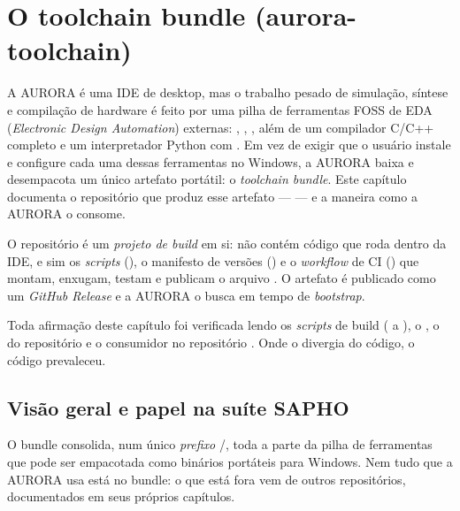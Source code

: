 \chapter{O toolchain bundle (aurora-toolchain)}
\label{cap:14-toolchain-bundle}

A AURORA é uma IDE de desktop, mas o trabalho pesado de simulação, síntese e
compilação de hardware é feito por uma pilha de ferramentas FOSS de EDA
(\emph{Electronic Design Automation}) externas: , ,
, além de um compilador C/C++ completo e um interpretador Python com
. Em vez de exigir que o usuário instale e configure cada uma dessas
ferramentas no Windows, a AURORA baixa e desempacota um único artefato portátil:
o \emph{toolchain bundle}. Este capítulo documenta o repositório que produz esse
artefato ---  --- e a maneira como a AURORA o consome.

O repositório  é um \emph{projeto de build} em si: não
contém código que roda dentro da IDE, e sim os \emph{scripts} (),
o manifesto de versões () e o \emph{workflow} de CI
() que montam, enxugam, testam e publicam o
arquivo . O artefato é publicado como um \emph{GitHub
Release} e a AURORA o busca em tempo de \emph{bootstrap}.

\begin{nota}
Toda afirmação deste capítulo foi verificada lendo os \emph{scripts} de build
( a ), o
, o  do repositório
 e o consumidor 
no repositório . Onde o  divergia do código, o
código prevaleceu.
\end{nota}

\section{Visão geral e papel na suíte SAPHO}

O bundle consolida, num único \emph{prefixo} /, toda a
parte da pilha de ferramentas que pode ser empacotada como binários portáteis
para Windows. Nem tudo que a AURORA usa está no bundle: o que está fora vem de
outros repositórios, documentados em seus próprios capítulos.

